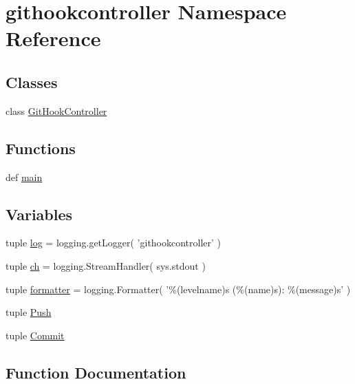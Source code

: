 \section{githookcontroller Namespace Reference}
\label{namespacegithookcontroller}
\subsection*{Classes}
\begin{DoxyCompactItemize}
\item 
class \hyperlink{classgithookcontroller_1_1GitHookController}{Git\-Hook\-Controller}
\end{DoxyCompactItemize}
\subsection*{Functions}
\begin{DoxyCompactItemize}
\item 
def \hyperlink{namespacegithookcontroller_a5c0a2facfdd7509f64df2aa6aefecf17}{main}
\end{DoxyCompactItemize}
\subsection*{Variables}
\begin{DoxyCompactItemize}
\item 
tuple \hyperlink{namespacegithookcontroller_a3bbdf7a562461bd3baca4ef635d6dd50}{log} = logging.\-get\-Logger( 'githookcontroller' )
\item 
tuple \hyperlink{namespacegithookcontroller_a13f0aa9843a2a5b05ba2e12f5ed3c903}{ch} = logging.\-Stream\-Handler( sys.\-stdout )
\item 
tuple \hyperlink{namespacegithookcontroller_a8672f684f117c8c4733546a0bc9e9616}{formatter} = logging.\-Formatter( '\%(levelname)s (\%(name)s)\-: \%(message)s' )
\item 
tuple \hyperlink{namespacegithookcontroller_ae617d8e0c886ed4e082bd11f1f33bd0d}{Push}
\item 
tuple \hyperlink{namespacegithookcontroller_af0d83e4b5f26b63a7ee452f3eb566ef4}{Commit}
\end{DoxyCompactItemize}


\subsection{Function Documentation}
